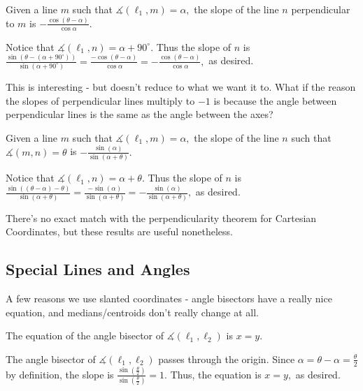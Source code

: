 \documentclass{article}
\begin{document}
\begin{theo}
Given a line $m$ such that $\measuredangle(\ell_1,m)=\alpha,$ the slope of the line $n$ perpendicular to $m$ is $-\frac{\cos(\theta-\alpha)}{\cos\alpha}.$
\end{theo}

\begin{pro}
Notice that $\measuredangle(\ell_1,n)=\alpha+90^{\circ}.$ Thus the slope of $n$ is $\frac{\sin(\theta-(\alpha+90^{\circ}))}{\sin(\alpha+90^{\circ})}=\frac{-\cos(\theta-\alpha)}{\cos\alpha}=-\frac{\cos(\theta-\alpha)}{\cos\alpha},$ as desired.
\end{pro}

This is interesting - but doesn't reduce to what we want it to. What if the reason the slopes of perpendicular lines multiply to $-1$ is because the angle between perpendicular lines is the same as the angle between the axes?

\begin{theo}
Given a line $m$ such that $\measuredangle(\ell_1,m)=\alpha,$ the slope of the line $n$ such that $\measuredangle(m,n)=\theta$ is $-\frac{\sin(\alpha)}{\sin(\alpha+\theta)}.$
\end{theo}

\begin{pro}
Notice that $\measuredangle(\ell_1,n)=\alpha+\theta.$ Thus the slope of $n$ is $\frac{\sin((\theta-\alpha)-\theta)}{\sin(\alpha+\theta)}=\frac{-\sin(\alpha)}{\sin(\alpha+\theta)}=-\frac{\sin(\alpha)}{\sin(\alpha+\theta)},$ as desired.
\end{pro}

There's no exact match with the perpendicularity theorem for Cartesian Coordinates, but these results are useful nonetheless.

\subsection{Special Lines and Angles}

A few reasons we use slanted coordinates - angle bisectors have a really nice equation, and medians/centroids don't really change at all.

\begin{theo}
The equation of the angle bisector of $\measuredangle(\ell_1,\ell_2)$ is $x=y.$
\end{theo}

\begin{pro}
The angle bisector of $\measuredangle(\ell_1,\ell_2)$ passes through the origin. Since $\alpha=\theta-\alpha=\frac{\theta}{2}$ by definition, the slope is $\frac{\sin(\frac{\theta}{2})}{\sin(\frac{\theta}{2})}=1.$ Thus, the equation is $x=y,$ as desired.
\end{pro}
\end{document}
